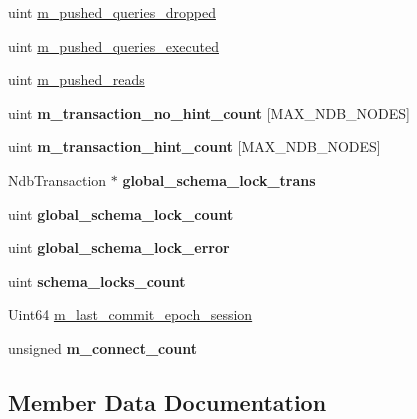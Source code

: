 \begin{DoxyCompactItemize}
\item 
uint \mbox{\hyperlink{classThd__ndb_a49c10f50086db9e89496a7340601d31e}{m\+\_\+pushed\+\_\+queries\+\_\+dropped}}
\item 
uint \mbox{\hyperlink{classThd__ndb_aa19ebeb5058afcbe72e14c0766b654cf}{m\+\_\+pushed\+\_\+queries\+\_\+executed}}
\item 
uint \mbox{\hyperlink{classThd__ndb_adaab6156dc12f5f9c08cf5930b9e61fb}{m\+\_\+pushed\+\_\+reads}}
\item 
\mbox{\label{classThd__ndb_a073a766e2fc5421c021f1d90bd4095fb}} 
uint {\bfseries m\+\_\+transaction\+\_\+no\+\_\+hint\+\_\+count} \mbox{[}M\+A\+X\+\_\+\+N\+D\+B\+\_\+\+N\+O\+D\+ES\mbox{]}
\item 
\mbox{\label{classThd__ndb_ac4e8deb67cd5d3ce3059466b1e8c8aea}} 
uint {\bfseries m\+\_\+transaction\+\_\+hint\+\_\+count} \mbox{[}M\+A\+X\+\_\+\+N\+D\+B\+\_\+\+N\+O\+D\+ES\mbox{]}
\item 
\mbox{\label{classThd__ndb_a022ddcc7a083139f3a84c39f799ca654}} 
Ndb\+Transaction $\ast$ {\bfseries global\+\_\+schema\+\_\+lock\+\_\+trans}
\item 
\mbox{\label{classThd__ndb_a8e80d45ad363ab830e1105147f06ab6b}} 
uint {\bfseries global\+\_\+schema\+\_\+lock\+\_\+count}
\item 
\mbox{\label{classThd__ndb_a0b178f605b2df1f616072875ac9ef9cb}} 
uint {\bfseries global\+\_\+schema\+\_\+lock\+\_\+error}
\item 
\mbox{\label{classThd__ndb_a480e508c05b9be71cb0fabe1d5a92cf1}} 
uint {\bfseries schema\+\_\+locks\+\_\+count}
\item 
Uint64 \mbox{\hyperlink{classThd__ndb_a117dad8fabd4e0cefa8738537c6ca831}{m\+\_\+last\+\_\+commit\+\_\+epoch\+\_\+session}}
\item 
\mbox{\label{classThd__ndb_a65909edfaa04fe5a70a1e848fcb029ae}} 
unsigned {\bfseries m\+\_\+connect\+\_\+count}
\end{DoxyCompactItemize}


\subsection{Member Data Documentation}
\mbox{\label{classThd__ndb_a117dad8fabd4e0cefa8738537c6ca831}} 
